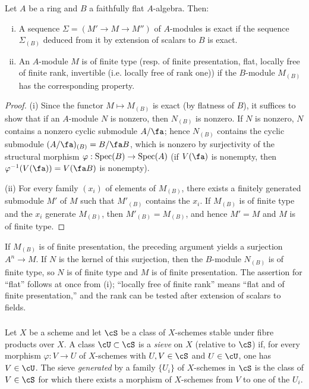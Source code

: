 \begin{proposition}\label{I:1-4-2}
Let $A$ be a ring and $B$ a faithfully flat $A$-algebra. Then:
\begin{enumerate}[(i)]
  \item A sequence $\Sigma=(M'\to M\to M'')$ of $A$-modules is exact if
    the sequence $\Sigma_{(B)}$ deduced from it by extension of scalars to
    $B$ is exact.
  \item An $A$-module $M$ is of finite type (resp. of finite presentation,
    flat, locally free of finite rank, invertible (i.e. locally free of rank
    one)) if the $B$-module $M_{(B)}$ has the corresponding property.
\end{enumerate}
\end{proposition}
\begin{proof}
(i) Since the functor $M\mapsto M_{(B)}$ is exact (by flatness of $B$),
it suffices to show that if an $A$-module $N$ is nonzero, then
$N_{(B)}$ is nonzero. If $N$ is nonzero, $N$ contains a nonzero cyclic
submodule $A/\fa$; hence $N_{(B)}$ contains the cyclic submodule
$(A/\fa)_{(B)}=B/\fa B$, which is nonzero by surjectivity of the
structural morphism $\varphi:\operatorname{Spec}(B)\to\operatorname{Spec}(A)$ (if $V(\fa)$ is
nonempty, then $\varphi^{-1}(V(\fa))=V(\fa B)$ is nonempty).

(ii) For every family $(x_i)$ of elements of $M_{(B)}$, there exists a
finitely generated submodule $M'$ of $M$ such that $M'_{(B)}$ contains
the $x_i$. If $M_{(B)}$ is of finite type and the $x_i$ generate
$M_{(B)}$, then $M'_{(B)}=M_{(B)}$, and hence $M'=M$ and $M$ is of
finite type.
\end{proof}

If $M_{(B)}$ is of finite presentation, the preceding argument yields a
surjection $A^n\to M$. If $N$ is the kernel of this surjection, then the
$B$-module $N_{(B)}$ is of finite type, so $N$ is of finite type and
$M$ is of finite presentation. The assertion for “flat” follows at once
from (i); “locally free of finite rank” means “flat and of finite
presentation,” and the rank can be tested after extension of scalars to
fields.

\subsubsection{}\label{I:1-4-3}

Let $X$ be a scheme and let $\cS$ be a class of $X$-schemes stable under
fibre products over $X$. A class $\cU\subset\cS$ is a \emph{sieve} on
$X$ (relative to $\cS$) if, for every morphism $\varphi:V\to U$ of
$X$-schemes with $U,V\in\cS$ and $U\in\cU$, one has $V\in\cU$.
The sieve \emph{generated} by a family $\{U_i\}$ of $X$-schemes in
$\cS$ is the class of $V\in\cS$ for which there exists a morphism of
$X$-schemes from $V$ to one of the $U_i$.

